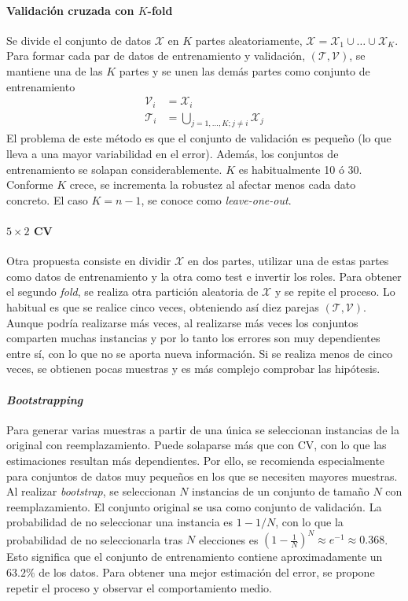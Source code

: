\paragraph{Validación cruzada con $K$-fold} Se divide el conjunto de datos $\mathcal{X}$ en $K$ partes aleatoriamente, $\mathcal{X} = \mathcal{X}_1 \cup \dots \cup \mathcal{X}_K$. Para formar cada par de datos de entrenamiento y validación, $(\mathcal{T}, \mathcal{V})$, se mantiene una de las $K$ partes y se unen las demás partes como conjunto de entrenamiento
\begin{align*}
	\mathcal{V}_i &= \mathcal{X}_i \\
	\mathcal{T}_i &= \underset{j=1,\dots,K; j\neq i}
							\bigcup \mathcal{X}_j
\end{align*} 
	El problema de este método es que el conjunto de validación es pequeño (lo que lleva a una mayor variabilidad en el error). Además, los conjuntos de entrenamiento se solapan considerablemente. $K$ es habitualmente 10 ó 30. Conforme $K$ crece, se incrementa la robustez al afectar menos cada dato concreto. El caso $K = n-1$, se conoce como \textit{leave-one-out}. 

\paragraph{$5 \times 2$ CV} Otra propuesta consiste en dividir $\mathcal{X}$ en dos partes, utilizar una de estas partes como datos de entrenamiento y la otra como test e invertir los roles. Para obtener el segundo \textit{fold}, se realiza otra partición aleatoria de $\mathcal{X}$ y se repite el proceso. Lo habitual es que se realice cinco veces, obteniendo así diez parejas $(\mathcal{T}, \mathcal{V})$. Aunque podría realizarse más veces, al realizarse más veces los conjuntos comparten muchas instancias y por lo tanto los errores son muy dependientes entre sí, con lo que no se aporta nueva información. Si se realiza menos de cinco veces, se obtienen pocas muestras y es más complejo comprobar las hipótesis.

\paragraph{\textit{Bootstrapping}} Para generar varias muestras a partir de una única se seleccionan instancias de la original con reemplazamiento. Puede solaparse más que con CV, con lo que las estimaciones resultan más dependientes. Por ello, se recomienda especialmente para conjuntos de datos muy pequeños en los que se necesiten mayores muestras. 
	Al realizar \textit{bootstrap}, se seleccionan $N$ instancias de un conjunto de tamaño $N$ con reemplazamiento. El conjunto original se usa como conjunto de validación. La probabilidad de no seleccionar una instancia es $1-1/N$, con lo que la probabilidad de no seleccionarla tras $N$ elecciones es $\left(1- \frac{1}{N}\right)^N \approx e^{-1} \approx 0.368$. Esto significa que el conjunto de entrenamiento contiene aproximadamente un $63.2\%$ de los datos. Para obtener una mejor estimación del error, se propone repetir el proceso y observar el comportamiento medio.
	
